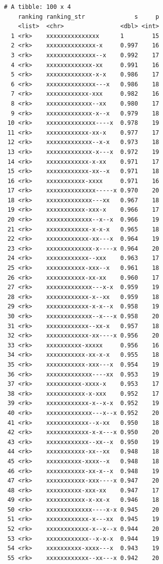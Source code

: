 \documentclass[
  letterpaper,
  DIV=11,
  numbers=noendperiod]{scrreprt}
\begin{document}
\begin{verbatim}
# A tibble: 100 x 4
    ranking ranking_str              s     p
    <list>  <chr>                <dbl> <int>
  1 <rk>    xxxxxxxxxxxxxxx      1        15
  2 <rk>    xxxxxxxxxxxxxx-x     0.997    16
  3 <rk>    xxxxxxxxxxxxxx--x    0.992    17
  4 <rk>    xxxxxxxxxxxxx-xx     0.991    16
  5 <rk>    xxxxxxxxxxxxx-x-x    0.986    17
  6 <rk>    xxxxxxxxxxxxxx---x   0.986    18
  7 <rk>    xxxxxxxxxxxx-xxx     0.982    16
  8 <rk>    xxxxxxxxxxxxx--xx    0.980    17
  9 <rk>    xxxxxxxxxxxxx-x--x   0.979    18
 10 <rk>    xxxxxxxxxxxxxx----x  0.978    19
 11 <rk>    xxxxxxxxxxxx-xx-x    0.977    17
 12 <rk>    xxxxxxxxxxxxx--x-x   0.973    18
 13 <rk>    xxxxxxxxxxxxx-x---x  0.972    19
 14 <rk>    xxxxxxxxxxxx-x-xx    0.971    17
 15 <rk>    xxxxxxxxxxxx-xx--x   0.971    18
 16 <rk>    xxxxxxxxxxx-xxxx     0.971    16
 17 <rk>    xxxxxxxxxxxxxx-----x 0.970    20
 18 <rk>    xxxxxxxxxxxxx---xx   0.967    18
 19 <rk>    xxxxxxxxxxx-xxx-x    0.966    17
 20 <rk>    xxxxxxxxxxxxx--x--x  0.966    19
 21 <rk>    xxxxxxxxxxxx-x-x-x   0.965    18
 22 <rk>    xxxxxxxxxxxx-xx---x  0.964    19
 23 <rk>    xxxxxxxxxxxxx-x----x 0.964    20
 24 <rk>    xxxxxxxxxxxx--xxx    0.963    17
 25 <rk>    xxxxxxxxxxx-xxx--x   0.961    18
 26 <rk>    xxxxxxxxxxx-xx-xx    0.960    17
 27 <rk>    xxxxxxxxxxxxx---x-x  0.959    19
 28 <rk>    xxxxxxxxxxxx-x--xx   0.959    18
 29 <rk>    xxxxxxxxxxxx-x-x--x  0.958    19
 30 <rk>    xxxxxxxxxxxxx--x---x 0.958    20
 31 <rk>    xxxxxxxxxxxx--xx-x   0.957    18
 32 <rk>    xxxxxxxxxxxx-xx----x 0.956    20
 33 <rk>    xxxxxxxxxx-xxxxx     0.956    16
 34 <rk>    xxxxxxxxxxx-xx-x-x   0.955    18
 35 <rk>    xxxxxxxxxxx-xxx---x  0.954    19
 36 <rk>    xxxxxxxxxxxxx----xx  0.953    19
 37 <rk>    xxxxxxxxxx-xxxx-x    0.953    17
 38 <rk>    xxxxxxxxxxx-x-xxx    0.952    17
 39 <rk>    xxxxxxxxxxxx-x--x-x  0.952    19
 40 <rk>    xxxxxxxxxxxxx---x--x 0.952    20
 41 <rk>    xxxxxxxxxxxx--x-xx   0.950    18
 42 <rk>    xxxxxxxxxxxx-x-x---x 0.950    20
 43 <rk>    xxxxxxxxxxxx--xx--x  0.950    19
 44 <rk>    xxxxxxxxxxx-xx--xx   0.948    18
 45 <rk>    xxxxxxxxxx-xxxx--x   0.948    18
 46 <rk>    xxxxxxxxxxx-xx-x--x  0.948    19
 47 <rk>    xxxxxxxxxxx-xxx----x 0.947    20
 48 <rk>    xxxxxxxxxx-xxx-xx    0.947    17
 49 <rk>    xxxxxxxxxxx-x-xx-x   0.946    18
 50 <rk>    xxxxxxxxxxxxx----x-x 0.945    20
 51 <rk>    xxxxxxxxxxxx-x---xx  0.945    19
 52 <rk>    xxxxxxxxxxxx-x--x--x 0.944    20
 53 <rk>    xxxxxxxxxxxx--x-x-x  0.944    19
 54 <rk>    xxxxxxxxxx-xxxx---x  0.943    19
 55 <rk>    xxxxxxxxxxxx--xx---x 0.942    20

\end{verbatim}
\end{document}
